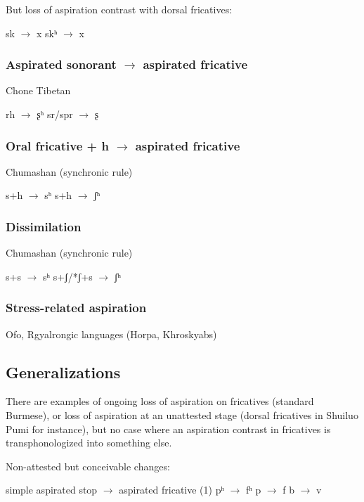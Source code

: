 \documentclass[oldfontcommands,oneside,a4paper,11pt]{article}
\begin{document}
But loss of aspiration contrast with dorsal fricatives:

\begin{exe}
\ex 
\glt *sk $\rightarrow$ x
\glt *skʰ $\rightarrow$ x
\end{exe}
\subsubsection{Aspirated sonorant $\rightarrow$ aspirated fricative}
Chone Tibetan
\begin{exe}
\ex 
\glt *rh $\rightarrow$ ʂʰ
\glt *sr/spr $\rightarrow$ ʂ
\end{exe}
\subsubsection{Oral fricative + h $\rightarrow$ aspirated fricative}

Chumashan (synchronic rule)

\begin{exe}
\ex 
\glt *s+h $\rightarrow$ sʰ
\glt *s+h $\rightarrow$ ʃʰ
\end{exe}
\subsubsection{Dissimilation}
Chumashan (synchronic rule)
\begin{exe}
\ex 
\glt *s+s $\rightarrow$ sʰ
\glt *s+ʃ/*ʃ+s $\rightarrow$ ʃʰ
\end{exe}

\subsubsection{Stress-related aspiration}
Ofo, Rgyalrongic languages (Horpa, Khroskyabs)

\subsection{Generalizations}
 

There are examples of ongoing loss of aspiration on fricatives (standard Burmese), or loss of aspiration at an unattested stage (dorsal fricatives in Shuiluo Pumi for instance), but no case where an aspiration contrast in fricatives is transphonologized into something else.

Non-attested but conceivable changes:
\begin{exe}
\ex 
\glt simple aspirated stop $\rightarrow$ aspirated fricative (1)
\glt *pʰ $\rightarrow$ fʰ
\glt *p $\rightarrow$ f
\glt *b $\rightarrow$ v
\end{exe}
\end{document}
